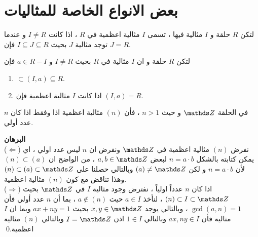\setRL
\section{بعض الانواع الخاصة للمثاليات}

\begin{definition}
	لتكن $R$ حلقة و $I$ مثالية فيها ، تسمى $I$ مثالية اعظمية في $R$ ، اذا كانت $I\neq R$ و عندما توجد مثالية $J$ بحيث 
	$I \subseteq J \subseteq R$ فإن $J=R$.
\end{definition}

\begin{note}
	لتكن $R$ حلقة و ان $I$ مثالية في $R$ بحيث  $I\neq R$ و $a\in R - I$ فإن
	\begin{enumerate}
		\item $\subset (I, a) \subseteq R $.
		\item  اذا كانت $I$ مثالية اعظمية فإن $(I, a) = R$.
	\end{enumerate}
\end{note}

\begin{theorem}
	في الحلقة $\Z$ و حيث $n>1$ ، فأن $(n)$ مثالية اعظمية اذا وفقط اذا كان $n$ عدد أولي.
\end{theorem}

\noindent
\textbf{البرهان}\\
\noindent
($\Leftarrow$) نفرض $(n)$ مثالية اعظمية في $\Z$ ونفرض ان $n$ ليس عدد اولي ، اي يمكن كتابته بالشكل $n=a\cdot b$ لبعض $a, b\in \Z$ ، من الواضح ان $(n) \subset (a)$ لأن $n=a\cdot b$ و لكن $(a)\neq \Z$ وبالتالي حصلنا على $(n) \subset (a) \subset \Z$ وهذا تناقض مع كون $(n)$ مثالية اعظمية.\\
($\Rightarrow$) اذا كان $n$ عدداً اولياً ، نفترض وجود مثالية $I$ في $\Z$ بحيث $(n )\subset I \subset \Z$ ، لنأخذ $a\in I$ حيث $a\notin (n)$ ، بما أن $n$  عدد أولي فأن $\gcd(a, n) = 1$ ، وبالتالي يوجد $x, y\in \Z$ بحيث $ax + ny=1$ وبما ان $I$ مثالية فأن $ax, ny\in I$ وبالتالي $1\in I$ اذن $I = \Z$ وبالتالي $(n)$ مثالية اعظمية.\qed  

